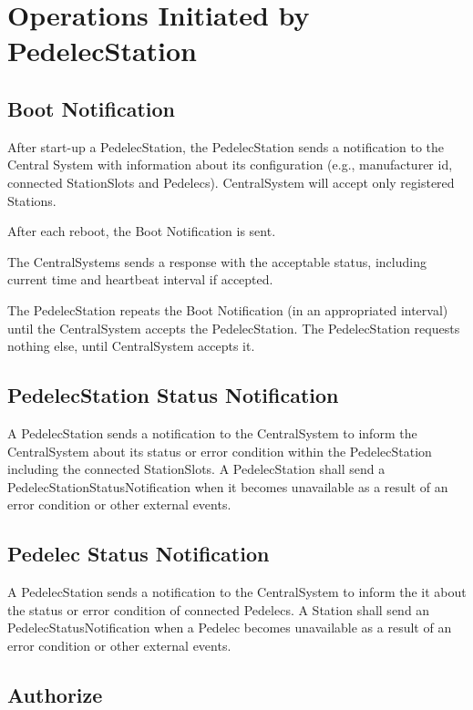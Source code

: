 \section{Operations Initiated by PedelecStation}

\subsection{Boot Notification}

After start-up a PedelecStation, the PedelecStation sends a notification to the Central System with information about its configuration (e.g., manufacturer id, connected StationSlots and Pedelecs). CentralSystem will accept only registered Stations. 

After each reboot, the Boot Notification is sent.

The CentralSystems sends a response with the acceptable status, including current time and heartbeat interval if accepted.

The PedelecStation repeats the Boot Notification (in an appropriated interval) until the CentralSystem accepts the PedelecStation. The PedelecStation requests nothing else, until CentralSystem accepts it.

\subsection{PedelecStation Status Notification}

A PedelecStation sends a notification to the CentralSystem to inform the CentralSystem about its status or error condition within the PedelecStation including the connected StationSlots. A PedelecStation shall send a PedelecStationStatusNotification when it becomes unavailable as a result of an error condition or other external events.

\subsection{Pedelec Status Notification}

A PedelecStation sends a notification to the CentralSystem to inform the it about the status or error condition of connected Pedelecs. A Station shall send an PedelecStatusNotification when a Pedelec becomes unavailable as a result of an error condition or other external events.

\subsection{Authorize}


